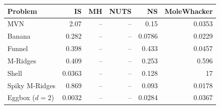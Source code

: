 \begin{tabular}{lrrrrr}
\toprule
Problem & IS & MH & NUTS & NS & MoleWhacker \\
\midrule
MVN & 2.07 & -- & -- & 0.15 & 0.0353 \\
Banana & 0.282 & -- & -- & 0.0786 & 0.0229 \\
Funnel & 0.398 & -- & -- & 0.433 & 0.0457 \\
M-Ridges & 0.409 & -- & -- & 0.253 & 0.596 \\
Shell & 0.0363 & -- & -- & 0.128 & 17 \\
Spiky M-Ridges & 0.869 & -- & -- & 0.093 & 0.0178 \\
\midrule
Eggbox ($d=2$) & 0.0032 & -- & -- & 0.0284 & 0.0367 \\
\bottomrule
\end{tabular}
